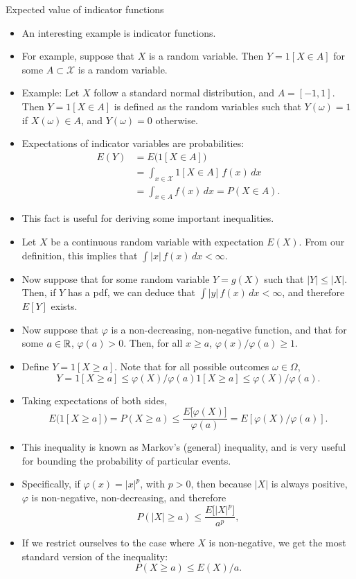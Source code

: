 \begin{frame}[allowframebreaks]{Expected value of indicator functions}
  \begin{itemize}
    \item An interesting example is \alert{indicator} functions.
    \item For example, suppose that $X$ is a random variable. Then $Y = 1[X \in A]$ for some $A \subset \mathcal{X}$ is a random variable.
    \item Example: Let $X$ follow a standard normal distribution, and $A = [-1, 1]$. Then $Y = 1[X \in A]$ is defined as the random variables such that $Y(\omega) = 1$ if $X(\omega) \in A$, and $Y(\omega) = 0$ otherwise.
    \item Expectations of indicator variables are \alert{probabilities}:
    \begin{align*}
    E(Y) &= E\big(1[X \in A]\big) \\
    &= \int_{x \in \mathcal{X}} 1[X \in A]\, f(x) \, dx \\
    & = \int_{x \in A} f(x) \, dx = P(X \in A).
    \end{align*}
    \item This fact is useful for deriving some important inequalities. 
    \item Let $X$ be a continuous random variable with expectation $E(X)$. From our definition, this implies that $\int |x|\, f(x)\,dx < \infty$.
    \item Now suppose that for some random variable $Y = g(X)$ such that $|Y| \leq |X|$. Then, if $Y$ has a pdf, we can deduce that $\int |y|\, f(x)\,dx < \infty$, and therefore $E[Y]$ exists.
    \item Now suppose that $\varphi$ is a non-decreasing, non-negative function, and that for some $a \in \mathbb{R}$, $\varphi(a) > 0$. Then, for all $x \geq a$, $\varphi(x) / \varphi(a) \geq 1$.
    \item Define $Y = 1[X \geq a]$. Note that for all possible outcomes $\omega \in \Omega$, 
    $$
    Y = 1[X \geq a] \leq \varphi(X) / \varphi(a) 1[X \geq a] \leq \varphi(X) / \varphi(a).
    $$
    \item Taking expectations of both sides,
    $$
    E\big(1[X \geq a]\big) = P(X \geq a) \leq \frac{E\big[\varphi(X)\big]}{\varphi(a)} = E\left[\varphi(X) / \varphi(a)\right].
    $$
    \item This inequality is known as \alert{Markov's (general) inequality}, and is very useful for bounding the probability of particular events. 
    \item Specifically, if $\varphi(x) = |x|^p$, with $p > 0$, then because $|X|$ is always positive, $\varphi$ is non-negative, non-decreasing, and therefore
    $$
    P(|X| \geq a) \leq \frac{E\big[|X|^p\big]}{a^p},
    $$
    \item If we restrict ourselves to the case where $X$ is non-negative, we get the most standard version of the inequality:
    $$
    P(X \geq a) \leq E(X) / a.
    $$
  \end{itemize}


\end{frame}

